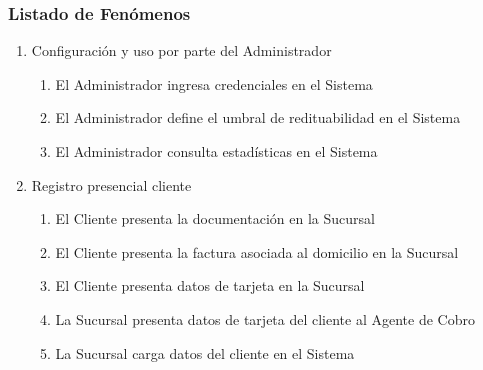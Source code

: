 \subsubsection{Listado de Fenómenos}
\begin{enumerate}
  \item Configuración y uso por parte del Administrador
  \begin{enumerate}
   \item El Administrador ingresa credenciales en el Sistema \label{itm:f-administrador-credencial-sistema}
   \item El Administrador define el umbral de redituabilidad en el Sistema \label{itm:f-administrador-umbral-sistema}
   \item El Administrador consulta estadísticas en el Sistema \label{itm:f-administrador-estadistica-sistema}
  \end{enumerate}

  \item Registro presencial cliente
  \begin{enumerate}
    \item El Cliente presenta la documentación en la Sucursal \label{itm:f-cliente-documentacion-sucursal}
    \item El Cliente presenta la factura asociada al domicilio en la Sucursal \label{itm:f-cliente-domicilio-sucursal}
    \item El Cliente presenta datos de tarjeta en la Sucursal \label{itm:f-cliente-tarjeta-sucursal}
    \item La Sucursal presenta datos de tarjeta del cliente al Agente de Cobro \label{itm:f-sucursal-tarjeta-agentecobro}
    \item La Sucursal carga datos del cliente en el Sistema \label{itm:f-sucursal-carga-cliente-sistema}
  \end{enumerate}


\end{enumerate}
